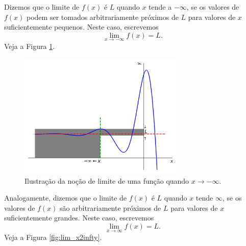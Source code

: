 \cleardoublepage\documentclass[../main.tex]{subfiles}
\begin{document}
Dizemos que o limite de $f(x)$ é $L$ quando $x$ tende a $-\infty$, se os valores de $f(x)$ podem ser tomados arbitrariamente próximos de $L$ para valores de $x$ suficientemente pequenos. Neste caso, escrevemos
\begin{equation*}
  \lim_{x\to -\infty} f(x) = L.
\end{equation*}
Veja a Figura \ref{fig:lim_x-infty}.

\begin{figure}[htb]
  \centering
  \includegraphics[width=0.7\textwidth]{fig_lim/fig_lim_x-infty}
  \caption{Ilustração da noção de limite de uma função quando $x\to -\infty$.}
  \label{fig:lim_x-infty}
\end{figure}

Analogamente, dizemos que o limite de $f(x)$ é $L$ quando $x$ tende $\infty$, se os valores de $f(x)$ são arbitrariamente próximos de $L$ para valores de $x$ suficientemente grandes. Neste caso, escrevemos
\begin{equation*}
  \lim_{x\to \infty} f(x) = L.
\end{equation*}
Veja a Figura \ref{fig:lim_x2infty}.
\end{document}
